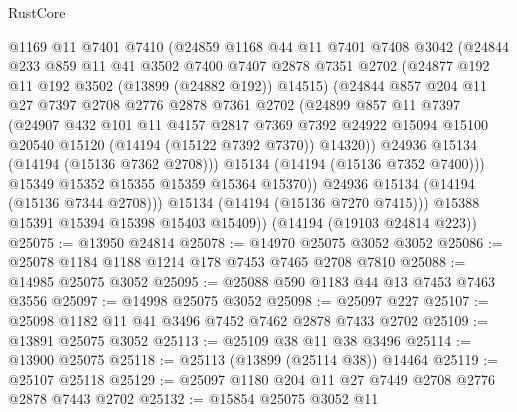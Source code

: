 \begin{lexlean}{RustCore}
\begin{coremodule}
              @1169
              @11
              @7401
              @7410
              (@24859
                @1168
                @44
                @11
                @7401
                @7408
                @3042
                (@24844
                  @233
                  @859
                  @11
                  @41
                  @3502
                  @7400
                  @7407
                  @2878
                  @7351
                  @2702
                  (@24877 @192 @11 @192 @3502 (@13899 (@24882 @192)) @14515)
                  (@24844
                    @857
                    @204
                    @11
                    @27
                    @7397
                    @2708
                    @2776
                    @2878
                    @7361
                    @2702
                    (@24899
                      @857
                      @11
                      @7397
                      (@24907
                        @432
                        @101
                        @11
                        @4157
                        @2817
                        @7369
                        @7392
                        @24922
                        @15094
                        @15100
                        @20540
                        @15120
                        (@14194 (@15122 @7392 @7370))
                        @14320))
                    @24936
                    @15134
                    (@14194 (@15136 @7362 @2708)))
                  @15134
                  (@14194 (@15136 @7352 @7400)))
                @15349
                @15352
                @15355
                @15359
                @15364
                @15370))
            @24936
            @15134
            (@14194 (@15136 @7344 @2708)))
          @15134
          (@14194 (@15136 @7270 @7415)))
        @15388
        @15391
        @15394
        @15398
        @15403
        @15409))
    (@14194 (@19103 @24814 @223))
@25075 := @13950 @24814
@25078 := @14970 @25075 @3052 @3052
@25086 := @25078 @1184 @1188 @1214 @178 @7453 @7465 @2708 @7810
@25088 := @14985 @25075 @3052
@25095 := @25088 @590 @1183 @44 @13 @7453 @7463 @3556
@25097 := @14998 @25075 @3052
@25098 := @25097 @227
@25107 := @25098 @1182 @11 @41 @3496 @7452 @7462 @2878 @7433 @2702
@25109 := @13891 @25075 @3052
@25113 := @25109 @38 @11 @38 @3496
@25114 := @13900 @25075
@25118 := @25113 (@13899 (@25114 @38)) @14464
@25119 := @25107 @25118
@25129 := @25097 @1180 @204 @11 @27 @7449 @2708 @2776 @2878 @7443 @2702
@25132 := @15854 @25075 @3052 @11

\end{coremodule}
\end{lexlean}
